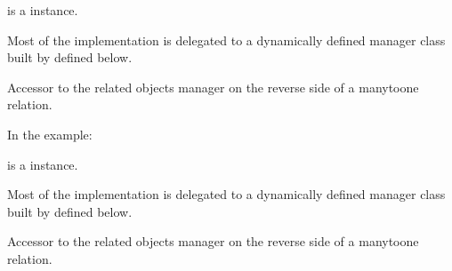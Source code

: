 \documentclass[a4paper,11pt,spanish]{sphinxmanual}
\begin{document}
\begin{fulllineitems}
\begin{fulllineitems}
\sphinxAtStartPar
{} is a  instance.

\sphinxAtStartPar
Most of the implementation is delegated to a dynamically defined manager
class built by  defined below.

\end{fulllineitems}


\begin{fulllineitems}
\label{\detokenize{api/inventory/inventory.models:inventory.models.Location.inventorymovement_set}}
\pysigstartsignatures
\pysigline
{}
\pysigstopsignatures
\sphinxAtStartPar
Accessor to the related objects manager on the reverse side of a
many\sphinxhyphen{}to\sphinxhyphen{}one relation.

\sphinxAtStartPar
In the example:

\begin{sphinxVerbatim}[commandchars=\\\{\}]
       
\end{sphinxVerbatim}

\sphinxAtStartPar
{} is a  instance.

\sphinxAtStartPar
Most of the implementation is delegated to a dynamically defined manager
class built by  defined below.

\end{fulllineitems}


\begin{fulllineitems}
\label{\detokenize{api/inventory/inventory.models:inventory.models.Location.inventoryperiodsnapshotitem_set}}
\pysigstartsignatures
\pysigline
{}
\pysigstopsignatures
\sphinxAtStartPar
Accessor to the related objects manager on the reverse side of a
many\sphinxhyphen{}to\sphinxhyphen{}one relation.


\end{fulllineitems}
\end{fulllineitems}
\end{document}
